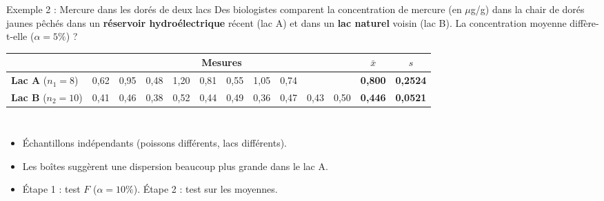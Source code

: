 \documentclass{BeamerTemplate}
\begin{document}
\begin{frame}[t]{Exemple 2 : Mercure dans les dorés de deux lacs}
  \small
  Des biologistes comparent la concentration de mercure (en $\mu$g/g) dans la chair de dorés jaunes pêchés dans un \textbf{réservoir hydroélectrique} récent (lac A) et dans un \textbf{lac naturel} voisin (lac B). La concentration moyenne diffère-t-elle ($\alpha = 5\%$) ?

  \smallskip
  \scriptsize
  \centering
  \begin{tabular}{lcccccccccccc}\toprule
    & \multicolumn{10}{c}{Mesures} & $\bar{x}$ & $s$ \\ \midrule
    \textbf{Lac A} ($n_1 = 8$)  & 0{,}62 & 0{,}95 & 0{,}48 & 1{,}20 & 0{,}81 & 0{,}55 & 1{,}05 & 0{,}74 & & & \textbf{0{,}800} & \textbf{0{,}2524} \\
    \textbf{Lac B} ($n_2 = 10$) & 0{,}41 & 0{,}46 & 0{,}38 & 0{,}52 & 0{,}44 & 0{,}49 & 0{,}36 & 0{,}47 & 0{,}43 & 0{,}50 & \textbf{0{,}446} & \textbf{0{,}0521} \\ \bottomrule
  \end{tabular}

  \medskip
  \begin{columns}[T]
      \centering

      \small
      \begin{itemize}\itemsep 2mm
        \item<2-> Échantillons \alert{indépendants} (poissons différents, lacs différents).
        \item<2-> Les boîtes suggèrent une dispersion \alert{beaucoup plus grande} dans le lac A.
        \item<2-> Étape 1 : test $F$ ($\alpha = 10\%$). Étape 2 : test sur les moyennes.
      \end{itemize}
  \end{columns}
\end{frame}
\end{document}
